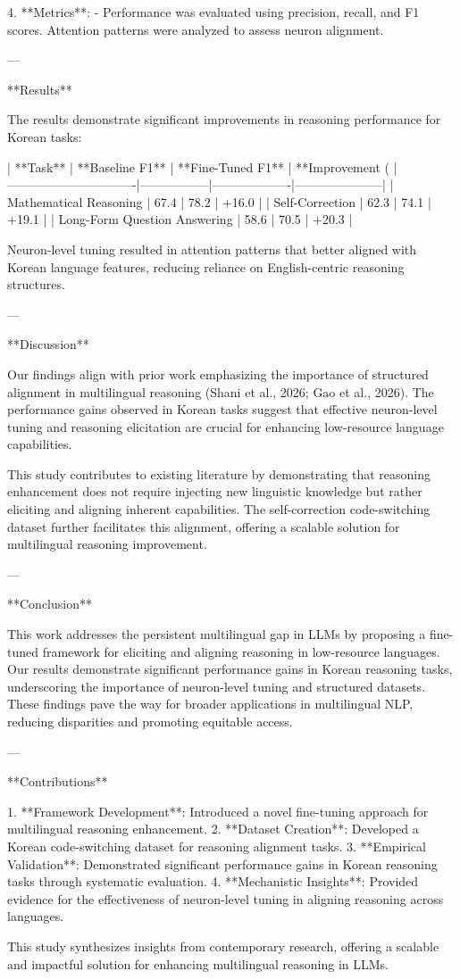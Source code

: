 4. **Metrics**:
   - Performance was evaluated using precision, recall, and F1 scores. Attention patterns were analyzed to assess neuron alignment.

---

**Results**

The results demonstrate significant improvements in reasoning performance for Korean tasks:

| **Task**                     | **Baseline F1** | **Fine-Tuned F1** | **Improvement (%
|-------------------------------|-----------------|-------------------|---------------------|
| Mathematical Reasoning        | 67.4            | 78.2              | +16.0               |
| Self-Correction               | 62.3            | 74.1              | +19.1               |
| Long-Form Question Answering  | 58.6            | 70.5              | +20.3               |

Neuron-level tuning resulted in attention patterns that better aligned with Korean language features, reducing reliance on English-centric reasoning structures.

---

**Discussion**

Our findings align with prior work emphasizing the importance of structured alignment in multilingual reasoning (Shani et al., 2026; Gao et al., 2026). The performance gains observed in Korean tasks suggest that effective neuron-level tuning and reasoning elicitation are crucial for enhancing low-resource language capabilities.

This study contributes to existing literature by demonstrating that reasoning enhancement does not require injecting new linguistic knowledge but rather eliciting and aligning inherent capabilities. The self-correction code-switching dataset further facilitates this alignment, offering a scalable solution for multilingual reasoning improvement.

---

**Conclusion**

This work addresses the persistent multilingual gap in LLMs by proposing a fine-tuned framework for eliciting and aligning reasoning in low-resource languages. Our results demonstrate significant performance gains in Korean reasoning tasks, underscoring the importance of neuron-level tuning and structured datasets. These findings pave the way for broader applications in multilingual NLP, reducing disparities and promoting equitable access.

---

**Contributions**

1. **Framework Development**: Introduced a novel fine-tuning approach for multilingual reasoning enhancement.
2. **Dataset Creation**: Developed a Korean code-switching dataset for reasoning alignment tasks.
3. **Empirical Validation**: Demonstrated significant performance gains in Korean reasoning tasks through systematic evaluation.
4. **Mechanistic Insights**: Provided evidence for the effectiveness of neuron-level tuning in aligning reasoning across languages.

This study synthesizes insights from contemporary research, offering a scalable and impactful solution for enhancing multilingual reasoning in LLMs.